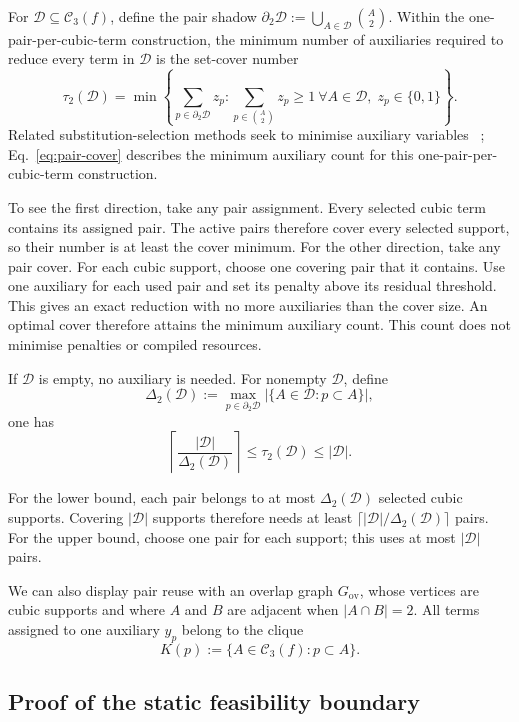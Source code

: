 \documentclass[a4paper,onecolumn,11pt,unpublished]{quantumarticle}
\theoremstyle{remark}
\begin{document}
For $\mathcal D\subseteq\mathcal C_3(f)$, define the pair shadow
\(
\partial_2\mathcal D
:=
\bigcup_{A\in\mathcal D}\binom{A}{2}.
\)
Within the one-pair-per-cubic-term construction, the minimum number of
auxiliaries required to reduce every term in $\mathcal D$ is the set-cover
number
\begin{equation}
\tau_2(\mathcal D)
=
\min
\left\{
\sum_{p\in\partial_2\mathcal D}z_p:
\sum_{p\in\binom{A}{2}}z_p\ge1\ \forall A\in\mathcal D,\;
z_p\in\{0,1\}
\right\}.
\label{eq:pair-cover}
\end{equation}
Related substitution-selection methods seek to minimise auxiliary variables
~\cite{VermaLewis2020,VermaLewisKochenberger2021,Schmidbauer2026};
Eq.~\eqref{eq:pair-cover} describes the minimum auxiliary count for this
one-pair-per-cubic-term construction.

To see the first direction, take any pair assignment. Every selected cubic
term contains its assigned pair. The active pairs therefore cover every
selected support, so their number is at least the cover minimum.
For the other direction, take any pair cover. For each cubic support,
choose one covering pair that it contains. Use one auxiliary for each used
pair and set its penalty above its residual threshold.
This gives an exact reduction with no more auxiliaries than the cover size.
An optimal cover therefore attains the minimum auxiliary count.
This count does not minimise penalties or compiled resources.

If $\mathcal D$ is empty, no auxiliary is needed.
For nonempty $\mathcal D$, define
\[
\Delta_2(\mathcal D)
:=
\max_{p\in\partial_2\mathcal D}
|\{A\in\mathcal D:p\subset A\}|,
\]
one has
\[
\left\lceil
\frac{|\mathcal D|}{\Delta_2(\mathcal D)}
\right\rceil
\le
\tau_2(\mathcal D)
\le
|\mathcal D|.
\]

For the lower bound, each pair belongs to at most $\Delta_2(\mathcal D)$
selected cubic supports. Covering $|\mathcal D|$ supports therefore needs
at least $\lceil|\mathcal D|/\Delta_2(\mathcal D)\rceil$ pairs.
For the upper bound, choose one pair for each support; this uses at most
$|\mathcal D|$ pairs.

We can also display pair reuse with an overlap graph
$G_{\mathrm{ov}}$, whose vertices are cubic supports and where
$A$ and $B$ are adjacent when $|A\cap B|=2$. All terms assigned to one
auxiliary $y_p$ belong to the clique
\[
K(p):=\{A\in\mathcal C_3(f):p\subset A\}.
\]
\subsection{Proof of the static feasibility boundary}
\label{app:static-boundary-proof-steps}
\end{document}
